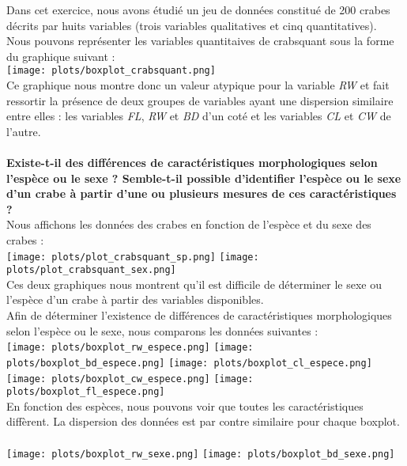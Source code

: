 \documentclass[a4paper, 10pt]{article}
\begin{document}
Dans cet exercice, nous avons \'etudi\'e un jeu de donn\'ees constitu\'e de 200 crabes d\'ecrits par huits variables
(trois variables qualitatives et cinq quantitatives).\\
Nous pouvons repr\'esenter les variables quantitaives de crabsquant sous la forme du graphique suivant :\\
\texttt{[image: plots/boxplot\_crabsquant.png]}\\
Ce graphique nous montre donc un valeur atypique pour la variable \textit{RW} et fait ressortir la pr\'esence de deux groupes de variables
ayant une dispersion similaire entre elles :
les variables \textit{FL}, \textit{RW} et \textit{BD} d'un cot\'e et les variables \textit{CL} et \textit{CW} de l'autre.\\ \\
\textbf{Existe-t-il des diff\'erences de caract\'eristiques morphologiques selon l'esp\`ece ou le sexe ?
Semble-t-il possible d'identifier l'esp\`ece ou le sexe d'un crabe \`a partir d'une ou plusieurs mesures de ces caract\'eristiques ?}\\
Nous affichons les donn\'ees des crabes en fonction de l'esp\`ece et du sexe des crabes :\\
\texttt{[image: plots/plot\_crabsquant\_sp.png]}
\texttt{[image: plots/plot\_crabsquant\_sex.png]}\\
Ces deux graphiques nous montrent qu'il est difficile de d\'eterminer le sexe ou l'esp\`ece d'un crabe \`a partir des variables disponibles.\\
Afin de d\'eterminer l'existence de diff\'erences de caract\'eristiques morphologiques selon l'esp\`ece ou le sexe, nous comparons les donn\'ees
suivantes :\\
\texttt{[image: plots/boxplot\_rw\_espece.png]}
\texttt{[image: plots/boxplot\_bd\_espece.png]}
\texttt{[image: plots/boxplot\_cl\_espece.png]}
\texttt{[image: plots/boxplot\_cw\_espece.png]}
\texttt{[image: plots/boxplot\_fl\_espece.png]}\\
En fonction des esp\`eces, nous pouvons voir que toutes les caract\'eristiques diff\`erent.
La dispersion des donn\'ees est par contre similaire pour chaque boxplot.\\ \\
\texttt{[image: plots/boxplot\_rw\_sexe.png]}
\texttt{[image: plots/boxplot\_bd\_sexe.png]}
\end{document}
